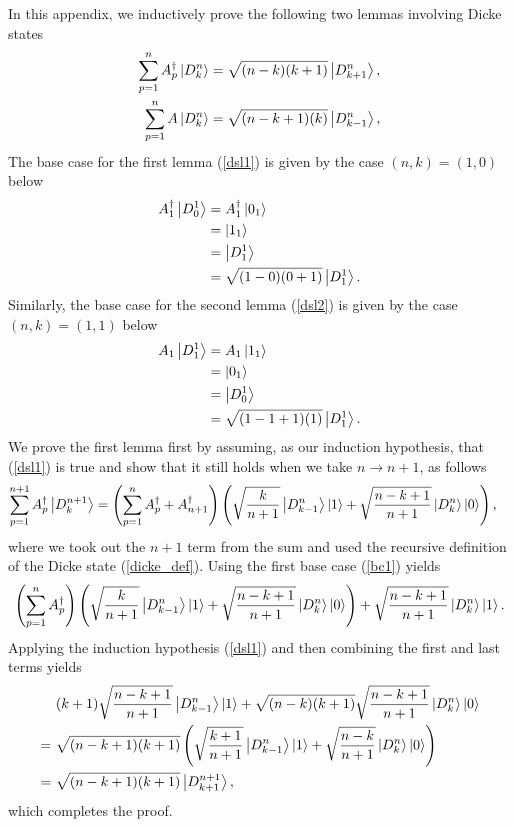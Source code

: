 \documentclass[10pt]{article}
\begin{document}
\begin{appendices}
In this appendix, we inductively prove the following two lemmas involving Dicke states
\begin{align}
\label{dsl1}
\sum_{p=1}^{n}A^\dagger_p\ket{D^n_k}
&=\sqrt{(n-k)(k+1)}\ket{D^n_{k+1}},
\\
\label{dsl2}
\sum_{p=1}^nA\ket{D^n_k}
&=\sqrt{(n-k+1)(k)}\ket{D^n_{k-1}},
\end{align}
The base case for the first lemma (\ref{dsl1}) is given by the case $(n,k)=(1,0)$ below
\begin{align}
\label{bc1}
A^\dagger_1\ket{D^1_0}
&=
A^\dagger_1\ket{0_1}
\nonumber
\\
&=
\ket{1_1}
\nonumber
\\
&=\ket{D^1_1}
\nonumber
\\
&=\sqrt{(1-0)(0+1)}\ket{D^1_1}.
\end{align}
Similarly, the base case for the second lemma (\ref{dsl2}) is given by the case $(n,k)=(1,1)$ below
\begin{align}
\label{bc2}
A_1\ket{D^1_1}
&=
A_1\ket{1_1}
\nonumber
\\
&=
\ket{0_1}
\nonumber
\\
&=\ket{D^1_0}
\nonumber
\\
&=\sqrt{(1-1+1)(1)}\ket{D^1_1}.
\end{align}
We prove the first lemma first by assuming, as our induction hypothesis, that (\ref{dsl1}) is true and show that it still holds when we take $n\to n+1$, as follows
\begin{align}
\sum_{p=1}^{n+1}A^\dagger_p\ket{D^{n+1}_k}
&=
\left(\sum_{p=1}^{n}A^\dagger_p + A^\dagger_{n+1}\right)\left(\sqrt{\frac{k}{n+1}}\ket{D^{n}_{k-1}}\ket{1}+\sqrt{\frac{n-k+1}{n+1}}\ket{D^{n}_k}\ket{0}\right),
\end{align}
where we took out the $n+1$ term from the sum and used the recursive definition of the Dicke state (\ref{dicke_def}).
Using the first base case (\ref{bc1}) yields
\begin{align}
\left(\sum_{p=1}^{n}A^\dagger_p\right)\left(\sqrt{\frac{k}{n+1}}\ket{D^{n}_{k-1}}\ket{1}+\sqrt{\frac{n-k+1}{n+1}}\ket{D^{n}_k}\ket{0}\right)
+
\sqrt{\frac{n-k+1}{n+1}}\ket{D^{n}_k}\ket{1}.
\end{align}
Applying the induction hypothesis (\ref{dsl1}) and then combining the first and last terms yields 
\begin{align}
&
(k+1)\sqrt{\frac{n-k+1}{n+1}}\ket{D^{n}_{k-1}}\ket{1}+\sqrt{(n-k)(k+1)}\sqrt{\frac{n-k+1}{n+1}}\ket{D^{n}_k}\ket{0}
\\
= \ &
\sqrt{(n-k+1)(k+1)}
\left(
\sqrt{\frac{k+1}{n+1}}\ket{D^{n}_{k-1}}\ket{1}+\sqrt{\frac{n-k}{n+1}}\ket{D^{n}_k}\ket{0}
\right)
\\
= \ &
\sqrt{(n-k+1)(k+1)}\ket{D^{n+1}_{k+1}},
\end{align}
which completes the proof. 


\end{appendices}
\end{document}
